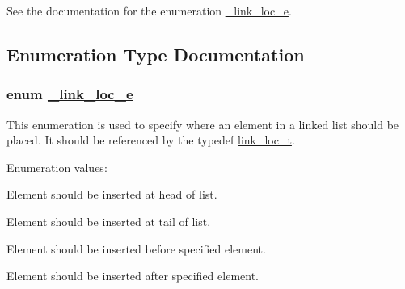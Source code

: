 See the documentation for the enumeration \hyperlink{group__dbprim__link_a26}{\_\-link\_\-loc\_\-e}. 

\subsection{Enumeration Type Documentation}
\hypertarget{group__dbprim__link_a26}{
\subsubsection[\_\-link\_\-loc\_\-e]{\setlength{\rightskip}{0pt plus 5cm}enum \hyperlink{group__dbprim__link_a26}{\_\-link\_\-loc\_\-e}}}
\label{group__dbprim__link_a26}


This enumeration is used to specify where an element in a linked list should be placed. It should be referenced by the typedef \hyperlink{group__dbprim__link_a4}{link\_\-loc\_\-t}. \begin{Desc}
\item[Enumeration values: ]\par
\begin{description}
\item[{\em 
\hypertarget{group__dbprim__link_a26a131}{
LINK\_\-LOC\_\-HEAD}
\label{group__dbprim__link_a26a131}
}]Element should be inserted at head of list. \item[{\em 
\hypertarget{group__dbprim__link_a26a132}{
LINK\_\-LOC\_\-TAIL}
\label{group__dbprim__link_a26a132}
}]Element should be inserted at tail of list. \item[{\em 
\hypertarget{group__dbprim__link_a26a133}{
LINK\_\-LOC\_\-BEFORE}
\label{group__dbprim__link_a26a133}
}]Element should be inserted before specified element. \item[{\em 
\hypertarget{group__dbprim__link_a26a134}{
LINK\_\-LOC\_\-AFTER}
\label{group__dbprim__link_a26a134}
}]Element should be inserted after specified element. \end{description}
\end{Desc}



